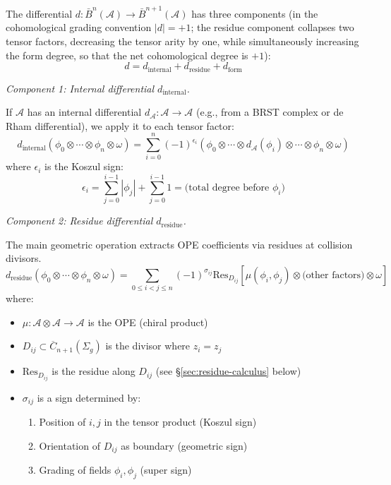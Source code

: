 \begin{definition}\label{def:bar-differential-complete}%
\label{def:geometric-bar}\label{def:geometric-bar-definition}\label{def:bar-geometric}%
\label{def:bar-diff-detailed}\label{def:diff-total}%
The differential $d: \bar{B}^n(\mathcal{A}) \to \bar{B}^{n+1}(\mathcal{A})$ has three components (in the cohomological grading convention $|d|=+1$; the residue component collapses two tensor factors, decreasing the tensor arity by one, while simultaneously increasing the form degree, so that the net cohomological degree is $+1$):
\[d = d_{\text{internal}} + d_{\text{residue}} + d_{\text{form}}\]

\emph{Component 1: Internal differential $d_{\text{internal}}$.}

If $\mathcal{A}$ has an internal differential $d_\mathcal{A}: \mathcal{A} \to \mathcal{A}$ (e.g., from a BRST complex or de Rham differential), we apply it to each tensor factor:
\[d_{\text{internal}}\left(\phi_0 \otimes \cdots \otimes \phi_n \otimes \omega\right) = \sum_{i=0}^n (-1)^{\epsilon_i} \left(\phi_0 \otimes \cdots \otimes d_\mathcal{A}(\phi_i) \otimes \cdots \otimes \phi_n \otimes \omega\right)\]
where $\epsilon_i$ is the Koszul sign:
\[\epsilon_i = \sum_{j=0}^{i-1} |\phi_j| + \sum_{j=0}^{i-1} 1 = \text{(total degree before } \phi_i\text{)}\]

\emph{Component 2: Residue differential $d_{\text{residue}}$.}

The main geometric operation extracts OPE coefficients via residues at collision divisors.
\[d_{\text{residue}}\left(\phi_0 \otimes \cdots \otimes \phi_n \otimes \omega\right) = \sum_{0 \leq i < j \leq n} (-1)^{\sigma_{ij}} \text{Res}_{D_{ij}}\left[\mu(\phi_i, \phi_j) \otimes \text{(other factors)} \otimes \omega\right]\]
where:
\begin{itemize}
\item $\mu: \mathcal{A} \otimes \mathcal{A} \to \mathcal{A}$ is the OPE (chiral product)
\item $D_{ij} \subset \overline{C}_{n+1}(\Sigma_g)$ is the divisor where $z_i = z_j$
\item $\text{Res}_{D_{ij}}$ is the residue along $D_{ij}$ (see \S\ref{sec:residue-calculus} below)
\item $\sigma_{ij}$ is a sign determined by:
  \begin{enumerate}
  \item Position of $i,j$ in the tensor product (Koszul sign)
  \item Orientation of $D_{ij}$ as boundary (geometric sign)
  \item Grading of fields $\phi_i, \phi_j$ (super sign)
  \end{enumerate}
\end{itemize}


\end{definition}
